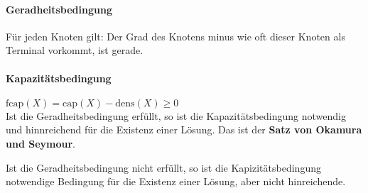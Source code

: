 \documentclass[a4paper,11pt]{report}
\begin{document}
\paragraph{Geradheitsbedingung}
Für jeden Knoten gilt: Der Grad des Knotens minus wie oft dieser Knoten als Terminal vorkommt, ist gerade.

\paragraph{Kapazitätsbedingung} $\text{fcap}(X) = \text{cap}(X) - \text{dens}(X) \geq 0$\\

Ist die Geradheitsbedingung erfüllt, so ist die Kapazitätsbedingung notwendig und hinnreichend für die Existenz einer Lösung. Das ist der \textbf{Satz von Okamura und Seymour}.

Ist die Geradheitsbedingung nicht erfüllt, so ist die Kapizitätsbedingung notwendige Bedingung für die Existenz einer Lösung, aber nicht hinreichende.
\end{document}
